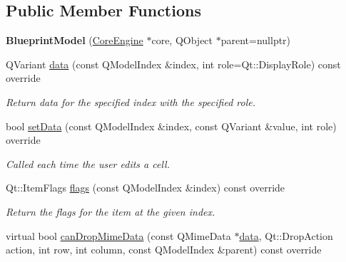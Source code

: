 \subsection*{Public Member Functions}
\begin{DoxyCompactItemize}
\item 
\mbox{\label{classrev_1_1_view_1_1_blueprint_model_abd40b692abc38e4b5ed7fbc32c6dcd7d}} 
{\bfseries Blueprint\+Model} (\mbox{\hyperlink{classrev_1_1_core_engine}{Core\+Engine}} $\ast$core, Q\+Object $\ast$parent=nullptr)
\item 
\mbox{\label{classrev_1_1_view_1_1_blueprint_model_a1a01840c5de031672e9615e92e0c90cb}} 
Q\+Variant \mbox{\hyperlink{classrev_1_1_view_1_1_blueprint_model_a1a01840c5de031672e9615e92e0c90cb}{data}} (const Q\+Model\+Index \&index, int role=Qt\+::\+Display\+Role) const override
\begin{DoxyCompactList}\small\item\em Return data for the specified index with the specified role. \end{DoxyCompactList}\item 
bool \mbox{\hyperlink{classrev_1_1_view_1_1_blueprint_model_a3667248cf4682dd62fe544c010eda75a}{set\+Data}} (const Q\+Model\+Index \&index, const Q\+Variant \&value, int role) override
\begin{DoxyCompactList}\small\item\em Called each time the user edits a cell. \end{DoxyCompactList}\item 
Qt\+::\+Item\+Flags \mbox{\hyperlink{classrev_1_1_view_1_1_blueprint_model_a393e5b036724bdcb6a564e43a0cbefdf}{flags}} (const Q\+Model\+Index \&index) const override
\begin{DoxyCompactList}\small\item\em Return the flags for the item at the given index. \end{DoxyCompactList}\item 
\mbox{\label{classrev_1_1_view_1_1_blueprint_model_a5d50906f800eaa62d42ad57aee267737}} 
virtual bool \mbox{\hyperlink{classrev_1_1_view_1_1_blueprint_model_a5d50906f800eaa62d42ad57aee267737}{can\+Drop\+Mime\+Data}} (const Q\+Mime\+Data $\ast$\mbox{\hyperlink{classrev_1_1_view_1_1_blueprint_model_a1a01840c5de031672e9615e92e0c90cb}{data}}, Qt\+::\+Drop\+Action action, int row, int column, const Q\+Model\+Index \&parent) const override

\end{DoxyCompactItemize}
